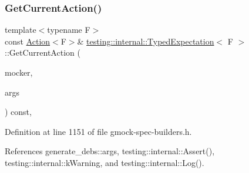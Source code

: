 \mbox{\label{classtesting_1_1internal_1_1TypedExpectation_a5053b8335ca295b34cd6a68f8d462602}} 
\subsubsection{\texorpdfstring{Get\+Current\+Action()}{GetCurrentAction()}}
{\footnotesize\ttfamily template$<$typename F$>$ \\
const \hyperlink{classtesting_1_1Action}{Action}$<$F$>$\& \hyperlink{classtesting_1_1internal_1_1TypedExpectation}{testing\+::internal\+::\+Typed\+Expectation}$<$ F $>$\+::Get\+Current\+Action (\begin{DoxyParamCaption}\item[{const \hyperlink{classtesting_1_1internal_1_1FunctionMockerBase}{Function\+Mocker\+Base}$<$ F $>$ $\ast$}]{mocker,  }\item[{const \hyperlink{classtesting_1_1internal_1_1TypedExpectation_a9a91379262d101f435809ba4556d14fa}{Argument\+Tuple} \&}]{args }\end{DoxyParamCaption}) const\hspace{0.3cm}{\ttfamily [inline]}, {\ttfamily [private]}}



Definition at line 1151 of file gmock-\/spec-\/builders.\+h.



References generate\+\_\+debs\+::args, testing\+::internal\+::\+Assert(), testing\+::internal\+::k\+Warning, and testing\+::internal\+::\+Log().


